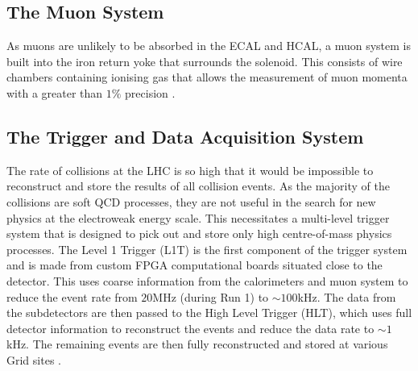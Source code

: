 \subsection{The Muon System} As muons are unlikely to be absorbed in
the ECAL and HCAL, a muon system is built into the iron return yoke
that surrounds the solenoid.  This consists of wire chambers
containing ionising gas that allows the measurement of muon momenta
with a greater than $1\%$ precision
\cite{CMS_Overview_Chatrchyan:2008aa}.

\subsection{The Trigger and Data Acquisition System}
\label{sec:triggers} The rate of collisions at the LHC is so high that
it would be impossible to reconstruct and store the results of all
collision events. As the majority of the collisions are soft QCD
processes, they are not useful in the search for new physics at the
electroweak energy scale. This necessitates a multi-level trigger
system that is designed to pick out and store only high centre-of-mass
physics processes. The Level 1 Trigger (L1T) is the first component of
the trigger system and is made from custom FPGA computational boards
situated close to the detector. This uses coarse information from the
calorimeters and muon system to reduce the event rate from $20$MHz
(during Run 1) to $\sim100$kHz. The data from the subdetectors are
then passed to the High Level Trigger (HLT), which uses full detector
information to reconstruct the events and reduce the data rate to
$\sim1$kHz. The remaining events are then fully reconstructed and
stored at various Grid sites \cite{GridTechDesign}.


